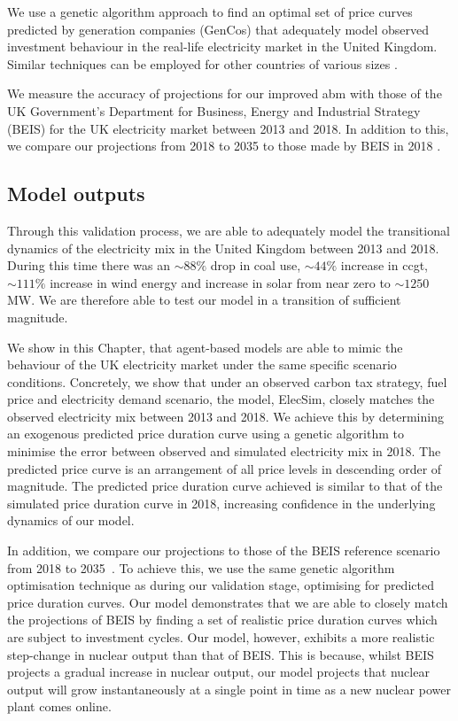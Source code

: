 We use a genetic algorithm approach to find an optimal set of price curves predicted by generation companies (GenCos) that adequately model observed investment behaviour in the real-life electricity market in the United Kingdom. Similar techniques can be employed for other countries of various sizes \cite{Kell}. 

We measure the accuracy of projections for our improved \acrshort{abm} with those of the UK Government's Department for Business, Energy and Industrial Strategy (BEIS) for the UK electricity market between 2013 and 2018. In addition to this, we compare our projections from 2018 to 2035 to those made by BEIS in 2018 \cite{DBEIS2019}.




\subsection{Model outputs}
\label{elecsim:sec:results}

Through this validation process, we are able to adequately model the transitional dynamics of the electricity mix in the United Kingdom between 2013 and 2018. During this time there was an ${\sim}88\%$ drop in coal use, ${\sim}44\%$ increase in \acrfull{ccgt}, ${\sim}111\% $ increase in wind energy and increase in solar from near zero to ${\sim}1250$MW. We are therefore able to test our model in a transition of sufficient magnitude.


We show in this Chapter, that agent-based models are able to mimic the behaviour of the UK electricity market under the same specific scenario conditions. Concretely, we show that under an observed carbon tax strategy, fuel price and electricity demand scenario, the model, ElecSim, closely matches the observed electricity mix between 2013 and 2018. We achieve this by determining an exogenous predicted price duration curve using a genetic algorithm to minimise the error between observed and simulated electricity mix in 2018. The predicted price curve is an arrangement of all price levels in descending order of magnitude. The predicted price duration curve achieved is similar to that of the simulated price duration curve in 2018, increasing confidence in the underlying dynamics of our model. 

In addition, we compare our projections to those of the BEIS reference scenario from 2018 to 2035~\cite{DBEIS2019}. To achieve this, we use the same genetic algorithm optimisation technique as during our validation stage, optimising for predicted price duration curves. Our model demonstrates that we are able to closely match the projections of BEIS by finding a set of realistic price duration curves which are subject to investment cycles. Our model, however, exhibits a more realistic step-change in nuclear output than that of BEIS. This is because, whilst BEIS projects a gradual increase in nuclear output, our model projects that nuclear output will grow instantaneously at a single point in time as a new nuclear power plant comes online. 

